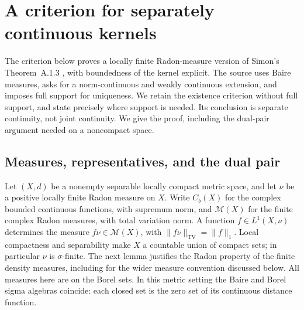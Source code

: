 \def\topic{Continuous integral kernels}

\section{A criterion for separately continuous kernels}
\label{sec:continuous_kernel_criterion}
The criterion below proves a locally finite Radon-measure version of
Simon's Theorem~A.1.3 \parencite{Simon1982Semigroups}, with boundedness of
the kernel explicit. The source uses Baire measures, asks for a
norm-continuous and weakly continuous extension, and imposes full
support for uniqueness. We retain the existence criterion without
full support, and state precisely where support is needed. Its
conclusion is separate continuity, not joint continuity. We give the
proof, including the dual-pair argument needed on a noncompact space.

\subsection{Measures, representatives, and the dual pair}
Let $(X,d)$ be a nonempty separable locally compact metric space, and let
$\nu$ be a positive locally finite Radon measure on $X$. Write
$C_b(X)$ for the complex bounded continuous functions, with supremum
norm, and $\mathcal M(X)$ for the finite complex Radon measures, with
total variation norm. A function $f\in L^1(X,\nu)$ determines the
measure $f\nu\in\mathcal M(X)$, with
$\|f\nu\|_{\mathrm{TV}}=\|f\|_1$. Local compactness and separability
make $X$ a countable union of compact sets; in particular $\nu$ is
$\sigma$-finite. The next lemma justifies the Radon property of the
finite density measures, including for the wider measure convention
discussed below. All measures here are on the Borel sets. In this
metric setting the Baire and Borel sigma algebras coincide: each closed
set is the zero set of its continuous distance function.

